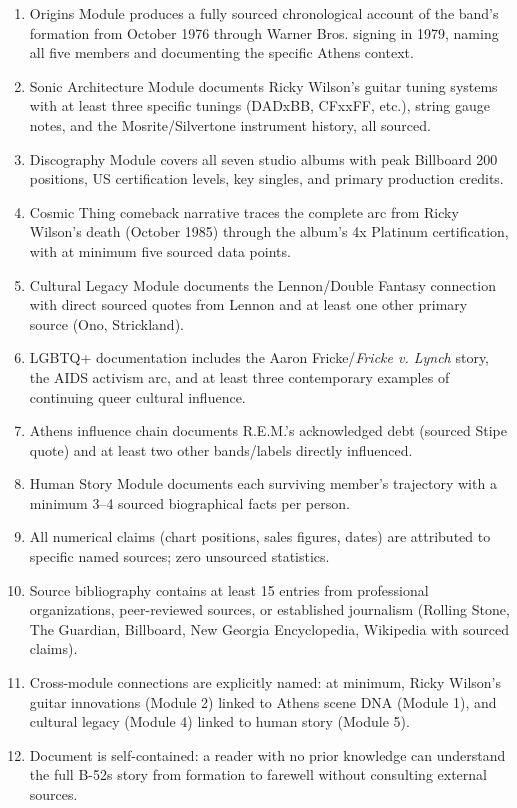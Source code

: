 \documentclass[11pt,letterpaper]{article}
\begin{document}
\begin{enumerate}
  \item Origins Module produces a fully sourced chronological account of the band's formation from October 1976 through Warner Bros. signing in 1979, naming all five members and documenting the specific Athens context.
  \item Sonic Architecture Module documents Ricky Wilson's guitar tuning systems with at least three specific tunings (DADxBB, CFxxFF, etc.), string gauge notes, and the Mosrite/Silvertone instrument history, all sourced.
  \item Discography Module covers all seven studio albums with peak Billboard 200 positions, US certification levels, key singles, and primary production credits.
  \item Cosmic Thing comeback narrative traces the complete arc from Ricky Wilson's death (October 1985) through the album's 4x Platinum certification, with at minimum five sourced data points.
  \item Cultural Legacy Module documents the Lennon/Double Fantasy connection with direct sourced quotes from Lennon and at least one other primary source (Ono, Strickland).
  \item LGBTQ+ documentation includes the Aaron Fricke/\textit{Fricke v. Lynch} story, the AIDS activism arc, and at least three contemporary examples of continuing queer cultural influence.
  \item Athens influence chain documents R.E.M.'s acknowledged debt (sourced Stipe quote) and at least two other bands/labels directly influenced.
  \item Human Story Module documents each surviving member's trajectory with a minimum 3--4 sourced biographical facts per person.
  \item All numerical claims (chart positions, sales figures, dates) are attributed to specific named sources; zero unsourced statistics.
  \item Source bibliography contains at least 15 entries from professional organizations, peer-reviewed sources, or established journalism (Rolling Stone, The Guardian, Billboard, New Georgia Encyclopedia, Wikipedia with sourced claims).
  \item Cross-module connections are explicitly named: at minimum, Ricky Wilson's guitar innovations (Module 2) linked to Athens scene DNA (Module 1), and cultural legacy (Module 4) linked to human story (Module 5).
  \item Document is self-contained: a reader with no prior knowledge can understand the full B-52s story from formation to farewell without consulting external sources.
\end{enumerate}
\end{document}
